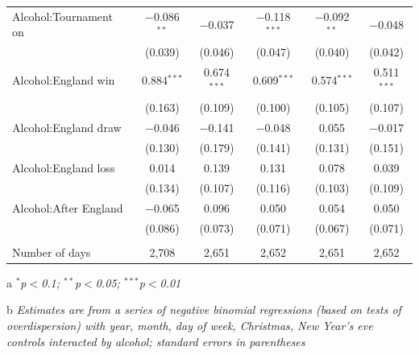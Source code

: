 \documentclass[12pt, letterpaper]{article}
\begin{document}
{\begin{table}[htp]
{\begin{threeparttable}
\begin{tabular}{@{\extracolsep{5pt}}lccccc}
  Alcohol:Tournament on & $-$0.086$^{**}$ & $-$0.037 & $-$0.118$^{***}$ & $-$0.092$^{**}$ & $-$0.048 \\ 
  & (0.039) & (0.046) & (0.047) & (0.040) & (0.042) \\ 
  Alcohol:England win & 0.884$^{***}$ & 0.674$^{***}$ & 0.609$^{***}$ & 0.574$^{***}$ & 0.511$^{***}$ \\ 
  & (0.163) & (0.109) & (0.100) & (0.105) & (0.107) \\ 
  Alcohol:England draw & $-$0.046 & $-$0.141 & $-$0.048 & 0.055 & $-$0.017 \\ 
  & (0.130) & (0.179) & (0.141) & (0.131) & (0.151) \\ 
  Alcohol:England loss & 0.014 & 0.139 & 0.131 & 0.078 & 0.039 \\ 
  & (0.134) & (0.107) & (0.116) & (0.103) & (0.109) \\ 
  Alcohol:After England & $-$0.065 & 0.096 & 0.050 & 0.054 & 0.050 \\ 
  & (0.086) & (0.073) & (0.071) & (0.067) & (0.071) \\ 
 \hline \\[-1.8ex] 
Number of days & 2,708 & 2,651 & 2,652 & 2,651 & 2,652 \\ 
\hline 

\end{tabular}
\begin{tablenotes}
      \item[a] \textit{$^{*}$p$<$0.1; $^{**}$p$<$0.05; $^{***}$p$<$0.01}
      \item[b] \textit{Estimates are from a series of negative binomial regressions (based on tests of overdispersion)  with year, month, day of week, Christmas, New Year's eve controls interacted by alcohol; standard errors in parentheses}
    \end{tablenotes}
\end{threeparttable} } 
\end{table}

}
\end{document}
